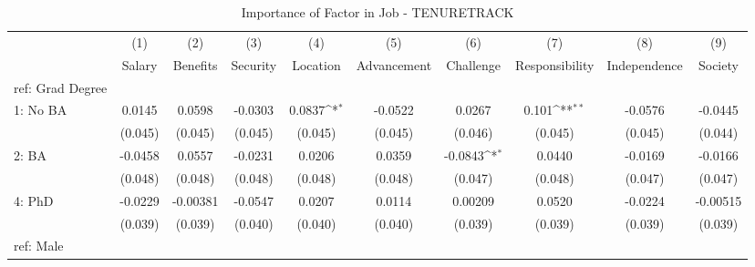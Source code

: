 \begin{table}[htbp]\centering
\def\sym#1{\ifmmode^{#1}\else\(^{#1}\)\fi}
\caption{Importance of Factor in Job - TENURETRACK \label{tab1}}
\begin{tabular}{l*{9}{c}}
\hline\hline
  &\multicolumn{1}{c}{(1)}&\multicolumn{1}{c}{(2)}&\multicolumn{1}{c}{(3)}&\multicolumn{1}{c}{(4)}&\multicolumn{1}{c}{(5)}&\multicolumn{1}{c}{(6)}&\multicolumn{1}{c}{(7)}&\multicolumn{1}{c}{(8)}&\multicolumn{1}{c}{(9)}\\
  &\multicolumn{1}{c}{Salary}&\multicolumn{1}{c}{Benefits}&\multicolumn{1}{c}{Security}&\multicolumn{1}{c}{Location}&\multicolumn{1}{c}{Advancement}&\multicolumn{1}{c}{Challenge}&\multicolumn{1}{c}{Responsibility}&\multicolumn{1}{c}{Independence}&\multicolumn{1}{c}{Society}\\
\hline
ref: Grad Degree&                     &                     &                     &                     &                     &                     &                     &                     &                     \\
[1em]
1: No BA&      0.0145         &      0.0598         &     -0.0303         &      0.0837\sym{*}  &     -0.0522         &      0.0267         &       0.101\sym{**} &     -0.0576         &     -0.0445         \\
  &     (0.045)         &     (0.045)         &     (0.045)         &     (0.045)         &     (0.045)         &     (0.046)         &     (0.045)         &     (0.045)         &     (0.044)         \\
[1em]
2: BA&     -0.0458         &      0.0557         &     -0.0231         &      0.0206         &      0.0359         &     -0.0843\sym{*}  &      0.0440         &     -0.0169         &     -0.0166         \\
  &     (0.048)         &     (0.048)         &     (0.048)         &     (0.048)         &     (0.048)         &     (0.047)         &     (0.048)         &     (0.047)         &     (0.047)         \\
[1em]
4: PhD&     -0.0229         &    -0.00381         &     -0.0547         &      0.0207         &      0.0114         &     0.00209         &      0.0520         &     -0.0224         &    -0.00515         \\
  &     (0.039)         &     (0.039)         &     (0.040)         &     (0.040)         &     (0.040)         &     (0.039)         &     (0.039)         &     (0.039)         &     (0.039)         \\
[1em]
ref: Male&                     &                     &                     &                     &                     &                     &                     &                     &                     \\

\end{tabular}
\end{table}

